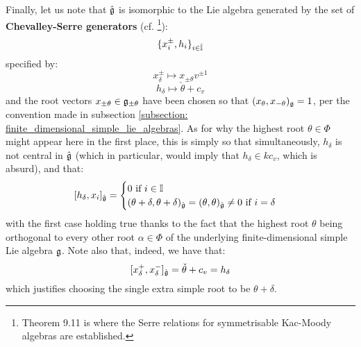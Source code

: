         Finally, let us note that $\hat{\mathfrak{g}}$ is isomorphic to the Lie algebra generated by the set of \textbf{Chevalley-Serre generators} (cf. \cite[Theorems 1.2, 1.4, and 9.11]{kac_infinite_dimensional_lie_algebras}\footnote{Theorem 9.11 is where the Serre relations for symmetrisable Kac-Moody algebras are established.}):
            $$\{x_i^{\pm}, h_i\}_{i \in \hat{\mathbb{I}}}$$
        specified by:
            $$x_{\delta}^{\pm} \mapsto x_{\pm \theta} v^{\pm 1}$$
            $$h_{\delta} \mapsto \check{\theta} + c_v$$
        and the root vectors $x_{\pm \theta} \in \mathfrak{g}_{\pm \theta}$ have been chosen so that $(x_{\theta}, x_{-\theta})_{\mathfrak{g}} = 1$, per the convention made in subsection \ref{subsection: finite_dimensional_simple_lie_algebras}. As for why the highest root $\theta \in \Phi$ might appear here in the first place, this is simply so that simultaneously, $h_{\delta}$ is not central in $\hat{\mathfrak{g}}$ (which in particular, would imply that $h_{\delta} \in k c_v$, which is absurd), and that:
            $$
                [h_{\delta}, x_i]_{\hat{\mathfrak{g}}} =
                \begin{cases}
                    \text{$0$ if $i \in \mathbb{I}$}
                    \\
                    \text{$(\theta + \delta, \theta + \delta)_{\hat{\mathfrak{g}}} = (\theta, \theta)_{\hat{\mathfrak{g}}} \not = 0$ if $i = \delta$}
                \end{cases}
            $$
        with the first case holding true thanks to the fact that the highest root $\theta$ being orthogonal to every other root $\alpha \in \Phi$ of the underlying finite-dimensional simple Lie algebra $\mathfrak{g}$. Note also that, indeed, we have that:
            $$[x_{\delta}^+, x_{\delta}^-]_{\hat{\mathfrak{g}}} = \check{\theta} + c_v = h_{\delta}$$
        which justifies choosing the single extra simple root to be $\theta + \delta$.